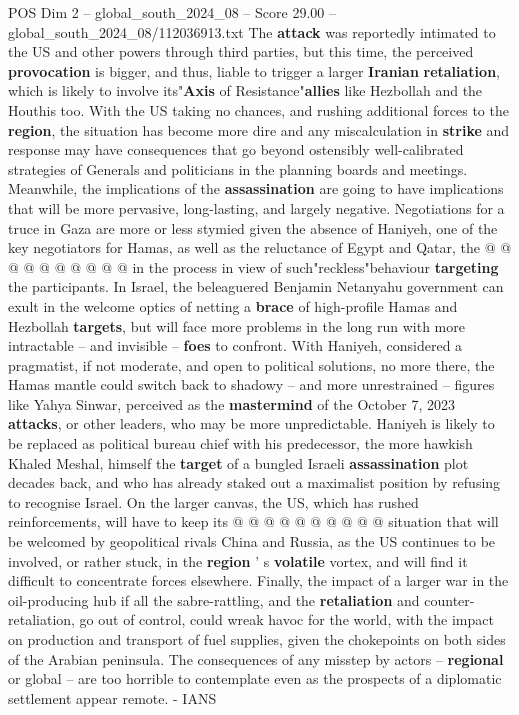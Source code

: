 \begin{textsample}{POS Dim 2 – global\_south\_2024\_08 – Score 29.00 – global\_south\_2024\_08/112036913.txt}
The \textbf{attack} was reportedly intimated to the US and other powers through third parties, but this time, the perceived \textbf{provocation} is bigger, and thus, liable to trigger a larger \textbf{Iranian} \textbf{retaliation}, which is likely to involve its"\textbf{Axis} of Resistance"\textbf{allies} like Hezbollah and the Houthis too.
With the US taking no chances, and rushing additional forces to the \textbf{region}, the situation has become more dire and any miscalculation in \textbf{strike} and response may have consequences that go beyond ostensibly well-calibrated strategies of Generals and politicians in the planning boards and meetings.
Meanwhile, the implications of the \textbf{assassination} are going to have implications that will be more pervasive, long-lasting, and largely negative.
Negotiations for a truce in Gaza are more or less stymied given the absence of Haniyeh, one of the key negotiators for Hamas, as well as the reluctance of Egypt and Qatar, the @ @ @ @ @ @ @ @ @ @ in the process in view of such"reckless"behaviour \textbf{targeting} the participants.
In Israel, the beleaguered Benjamin Netanyahu government can exult in the welcome optics of netting a \textbf{brace} of high-profile Hamas and Hezbollah \textbf{targets}, but will face more problems in the long run with more intractable -- and invisible -- \textbf{foes} to confront.
With Haniyeh, considered a pragmatist, if not moderate, and open to political solutions, no more there, the Hamas mantle could switch back to shadowy -- and more unrestrained -- figures like Yahya Sinwar, perceived as the \textbf{mastermind} of the October 7, 2023 \textbf{attacks}, or other leaders, who may be more unpredictable.
Haniyeh is likely to be replaced as political bureau chief with his predecessor, the more hawkish Khaled Meshal, himself the \textbf{target} of a bungled Israeli \textbf{assassination} plot decades back, and who has already staked out a maximalist position by refusing to recognise Israel.
On the larger canvas, the US, which has rushed reinforcements, will have to keep its @ @ @ @ @ @ @ @ @ @ situation that will be welcomed by geopolitical rivals China and Russia, as the US continues to be involved, or rather stuck, in the \textbf{region} ' s \textbf{volatile} vortex, and will find it difficult to concentrate forces elsewhere.
Finally, the impact of a larger war in the oil-producing hub if all the sabre-rattling, and the \textbf{retaliation} and counter-retaliation, go out of control, could wreak havoc for the world, with the impact on production and transport of fuel supplies, given the chokepoints on both sides of the Arabian peninsula.
The consequences of any misstep by actors -- \textbf{regional} or global -- are too horrible to contemplate even as the prospects of a diplomatic settlement appear remote. - IANS

\end{textsample}
